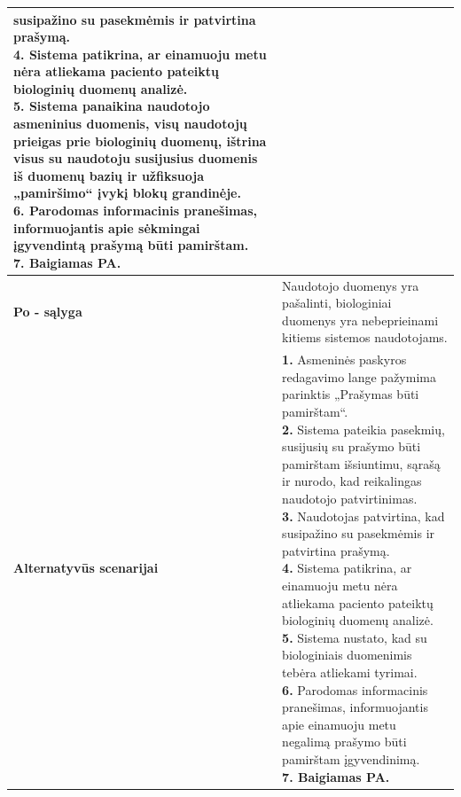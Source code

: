 \documentclass[12pt]{article}
\begin{document}
\begin{table}[htb!]
\begin{tabular}{|m{3cm}|m{13.7cm}|}
{{{            susipažino su pasekmėmis ir patvirtina prašymą.} \\
            \textbf{4.} {Sistema patikrina, ar einamuoju metu nėra atliekama
            paciento pateiktų biologinių duomenų analizė.} \\
            \textbf{5.} {Sistema panaikina naudotojo asmeninius duomenis, visų
            naudotojų prieigas prie biologinių duomenų, ištrina visus su
            naudotoju susijusius duomenis iš duomenų bazių ir užfiksuoja
            „pamiršimo“ įvykį blokų grandinėje.} \\
            \textbf{6.} {Parodomas informacinis pranešimas, informuojantis apie
            sėkmingai įgyvendintą prašymą būti pamirštam.} \\
            \textbf{7. Baigiamas PA.}
        }}
        \\
        \hline
        \raggedleft \textbf{\cellcolor{deepchampagne}Po - sąlyga} &
        Naudotojo duomenys yra pašalinti, biologiniai duomenys yra nebeprieinami
        kitiems sistemos naudotojams. \\
        \hline
        \raggedleft \textbf{\cellcolor{deepchampagne}Alternatyvūs scenarijai} &
        \vskip 5pt
        \makecell[l]{\parbox[t]{13.7cm}{
            \textbf{1.} \textcolor{dartmouthgreen}{Asmeninės paskyros redagavimo
            lange pažymima parinktis „Prašymas būti pamirštam“.} \\
            \textbf{2.} {Sistema pateikia pasekmių,
            susijusių su prašymo būti pamirštam išsiuntimu, sąrašą ir
            nurodo, kad reikalingas naudotojo patvirtinimas.} \\
            \textbf{3.} \textcolor{dartmouthgreen}{Naudotojas patvirtina, kad
            susipažino su pasekmėmis ir patvirtina prašymą.} \\
            \textbf{4.} {Sistema patikrina, ar
            einamuoju metu nėra atliekama paciento pateiktų biologinių duomenų
            analizė.} \\
            \textbf{5.} {Sistema nustato, kad su
            biologiniais duomenimis tebėra atliekami tyrimai.} \\
            \textbf{6.} {Parodomas informacinis
            pranešimas, informuojantis apie einamuoju metu negalimą prašymo
            būti pamirštam įgyvendinimą.} \\
            \textbf{7. Baigiamas PA.}
        }}
        \\
        \hline
    \end{tabular}
\end{table}
\end{document}

